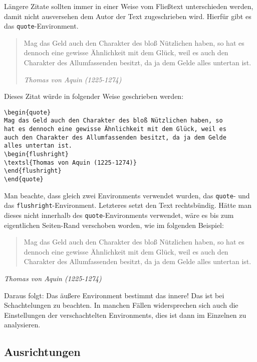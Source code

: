 Längere Zitate sollten immer in einer Weise vom Fließtext unterschieden werden, damit nicht ausversehen dem Autor der Text zugeschrieben wird. Hierfür gibt es das \texttt{quote}-Environment.

\begin{quote}
Mag das Geld auch den Charakter des bloß Nützlichen haben, so hat es dennoch eine gewisse Ähnlichkeit mit dem Glück, weil es auch den Charakter des Allumfassenden besitzt, da ja dem Gelde alles untertan ist.
\begin{flushright}
\textsl{Thomas von Aquin (1225-1274)}
\end{flushright}
\end{quote}
Dieses Zitat würde in folgender Weise geschrieben werden:
\begin{verbatim}
\begin{quote}
Mag das Geld auch den Charakter des bloß Nützlichen haben, so 
hat es dennoch eine gewisse Ähnlichkeit mit dem Glück, weil es 
auch den Charakter des Allumfassenden besitzt, da ja dem Gelde 
alles untertan ist.
\begin{flushright}
\textsl{Thomas von Aquin (1225-1274)}
\end{flushright}
\end{quote}
\end{verbatim}
Man beachte, dass gleich zwei Environments verwendet wurden, das \texttt{quote}- und das \texttt{flushright}-Environment. Letzteres setzt den Text rechtsbündig. Hätte man dieses nicht innerhalb des \texttt{quote}-Environments verwendet, wäre es bis zum eigentlichen Seiten-Rand verschoben worden, wie im folgenden Beispiel:

\begin{quote}
Mag das Geld auch den Charakter des bloß Nützlichen haben, so 
hat es dennoch eine gewisse Ähnlichkeit mit dem Glück, weil es 
auch den Charakter des Allumfassenden besitzt, da ja dem Gelde 
alles untertan ist.
\end{quote}
\begin{flushright}
\textsl{Thomas von Aquin (1225-1274)}
\end{flushright}
Daraus folgt: Das äußere Environment bestimmt das innere! Das ist bei Schachtelungen zu beachten. In manchen Fällen widersprechen sich auch die Einstellungen der verschachtelten Environments, dies ist dann im Einzelnen zu analysieren.

\subsection{Ausrichtungen}

